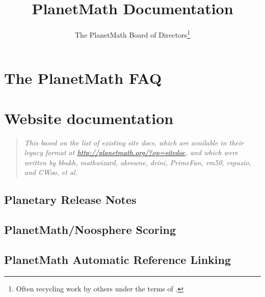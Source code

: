 \documentclass[12pt,report]{memoir}
\begin{document}
\renewcommand{\abstract}[1]{\begin{center}\begin{quote}
\emph{#1}
\end{quote}\end{center}}

\title{PlanetMath Documentation}
\author{The PlanetMath Board of Directors\thanks{Often recycling work by others under the terms of \ccbysa.}}

\begin{titlingpage}
\maketitle
\end{titlingpage}

\frontmatter

\renewcommand{\cftchapterfont}{\scshape}
\renewcommand{\cftchapterpagefont}{\scshape}

\tableofcontents*
\cleardoublepage

\mainmatter

\chapter{The PlanetMath FAQ}


\chapter{Website documentation}

\abstract{This based on the list of existing site docs, which are
  available in their legacy format at
  \url{http://planetmath.org/?op=sitedoc}, and which were written by
  bbukh, mathwizard, akrowne, drini, PrimeFan, rm50, rspuzio, and
  CWoo, et al.}

\section{Planetary Release Notes}


\section{PlanetMath/Noosphere Scoring}


\section{PlanetMath Automatic Reference Linking}

\end{document}
